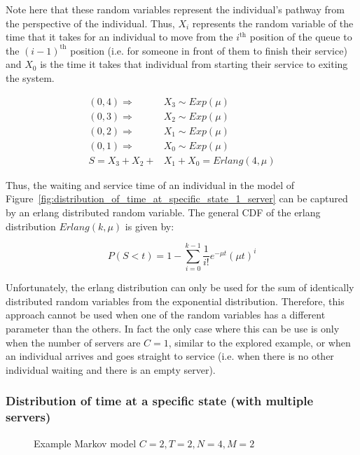 Note here that these random variables represent the individual's pathway from
the perspective of the individual.
Thus, \(X_i\) represents the random variable of the time that it takes for an
individual to move from the \(i^{\text{th}}\) position of the queue to the
\((i-1)^{\text{th}}\) position (i.e. for someone in front of them to finish
their service) and \(X_0\) is the time it takes that individual from
starting their service to exiting the system.


\begin{align}
    (0,4) \Rightarrow \quad & X_3 \sim Exp(\mu) \nonumber \\
    (0,3) \Rightarrow \quad & X_2 \sim Exp(\mu) \nonumber \\
    (0,2) \Rightarrow \quad & X_1 \sim Exp(\mu) \nonumber \\
    (0,1) \Rightarrow \quad & X_0 \sim Exp(\mu) \nonumber \\
    S = X_3 + X_2 + & X_1 + X_0 = Erlang(4, \mu)
\end{align}

Thus, the waiting and service time of an individual in the model of
Figure~\ref{fig:distribution_of_time_at_specific_state_1_server}
can be captured by an
erlang distributed random variable.
The general CDF of the erlang distribution \(Erlang(k, \mu)\) is given by:

\begin{equation} \label{eq:cdf_erlang}
    P(S < t) = 1 - \sum_{i=0}^{k-1} \frac{1}{i!} e^{-\mu t} (\mu t)^i
\end{equation}

Unfortunately, the erlang distribution can only be used for the sum of
identically distributed random variables from the exponential distribution.
Therefore, this approach cannot be used when one of the random variables has a
different parameter than the others.
In fact the only case where this can be use is only when the number of servers 
are \(C=1\), similar to the explored example, or when an individual arrives
and goes straight to service (i.e. when there is no other individual waiting
and there is an empty server).


\subsubsection{Distribution of time at a specific state (with multiple servers)}

\begin{figure}[H]
    \centering
    \scalebox{0.75}{}
    \caption{Example Markov model \(C=2, T=2, N=4, M=2\)}
    \label{fig:distribution_of_time_at_specific_state_2_servers}
\end{figure}

